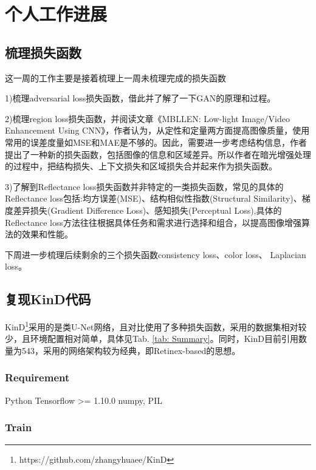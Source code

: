 \documentclass[letterpaper,12pt]{article}
\begin{document}
	\section{个人工作进展}
	
	\subsection{梳理损失函数}
	
	这一周的工作主要是接着梳理上一周未梳理完成的损失函数
	
	1)梳理adversarial loss损失函数，借此并了解了一下GAN的原理和过程。
	
	2)梳理region loss损失函数，并阅读文章《MBLLEN: Low-light Image/Video Enhancement Using CNN》，作者\cite{lv2018mbllen}认为，从定性和定量两方面提高图像质量，使用常用的误差度量如MSE和MAE是不够的。因此，需要进一步考虑结构信息，作者提出了一种新的损失函数，包括图像的信息和区域差异。所以作者在暗光增强处理的过程中，把结构损失、上下文损失和区域损失合并起来作为损失函数。
	
	3)了解到Reflectance loss损失函数并非特定的一类损失函数，常见的具体的Reflectance loss包括:均方误差(MSE)、结构相似性指数(Structural Similarity)、梯度差异损失(Gradient Difference Loss)、感知损失(Perceptual Loss),具体的Reflectance loss方法往往根据具体任务和需求进行选择和组合，以提高图像增强算法的效果和性能。
	
	下周进一步梳理后续剩余的三个损失函数consistency loss、color loss、 Laplacian loss。
	
	
	\subsection{复现KinD代码}
	
	KinD\footnote{https://github.com/zhangyhuaee/KinD}采用的是类U-Net网络，且对比使用了多种损失函数，采用的数据集相对较少，且环境配置相对简单，具体见Tab. \ref{tab: Summary}。同时，KinD\cite{10.1145/3343031.3350926}目前引用数量为543，采用的网络架构较为经典，即Retinex-based的思想。
	
		\subsubsection{Requirement}
	
		\begin{python}
		Python
		Tensorflow >= 1.10.0
		numpy, PIL
		\end{python}
	
		\subsubsection{Train}
	
\end{document}
